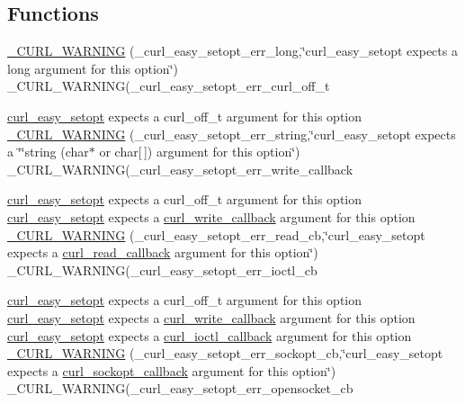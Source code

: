 \subsection*{Functions}
\begin{DoxyCompactItemize}
\item 
\hyperlink{typecheck-gcc_8h_a835f9ac5fa04c88a7cd643014f43c521}{\+\_\+\+C\+U\+R\+L\+\_\+\+W\+A\+R\+N\+I\+N\+G} (\+\_\+curl\+\_\+easy\+\_\+setopt\+\_\+err\+\_\+long,\char`\"{}curl\+\_\+easy\+\_\+setopt expects a long argument for this option\char`\"{}) \+\_\+\+C\+U\+R\+L\+\_\+\+W\+A\+R\+N\+I\+N\+G(\+\_\+curl\+\_\+easy\+\_\+setopt\+\_\+err\+\_\+curl\+\_\+off\+\_\+t
\item 
\hyperlink{easy_8h_a7b171739b7bb728b3b58b2e6ec454aa0}{curl\+\_\+easy\+\_\+setopt} expects a curl\+\_\+off\+\_\+t argument for this option \hyperlink{typecheck-gcc_8h_a219fe3ed7d487a8ffe131d7330ca2483}{\+\_\+\+C\+U\+R\+L\+\_\+\+W\+A\+R\+N\+I\+N\+G} (\+\_\+curl\+\_\+easy\+\_\+setopt\+\_\+err\+\_\+string,\char`\"{}curl\+\_\+easy\+\_\+setopt expects a \char`\"{}\char`\"{}string (char$\ast$ or char\mbox{[}$\,$\mbox{]}) argument for this option\char`\"{}) \+\_\+\+C\+U\+R\+L\+\_\+\+W\+A\+R\+N\+I\+N\+G(\+\_\+curl\+\_\+easy\+\_\+setopt\+\_\+err\+\_\+write\+\_\+callback
\item 
\hyperlink{easy_8h_a7b171739b7bb728b3b58b2e6ec454aa0}{curl\+\_\+easy\+\_\+setopt} expects a curl\+\_\+off\+\_\+t argument for this option \hyperlink{easy_8h_a7b171739b7bb728b3b58b2e6ec454aa0}{curl\+\_\+easy\+\_\+setopt} expects a \hyperlink{curl_8h_ad65e62dcde45b356254b0f25f38dd802}{curl\+\_\+write\+\_\+callback} argument for this option \hyperlink{typecheck-gcc_8h_ab760cc0249f77f50bcb61700f5da7dd5}{\+\_\+\+C\+U\+R\+L\+\_\+\+W\+A\+R\+N\+I\+N\+G} (\+\_\+curl\+\_\+easy\+\_\+setopt\+\_\+err\+\_\+read\+\_\+cb,\char`\"{}curl\+\_\+easy\+\_\+setopt expects a \hyperlink{curl_8h_a7516630ec17f247697dd3272be7ada74}{curl\+\_\+read\+\_\+callback} argument for this option\char`\"{}) \+\_\+\+C\+U\+R\+L\+\_\+\+W\+A\+R\+N\+I\+N\+G(\+\_\+curl\+\_\+easy\+\_\+setopt\+\_\+err\+\_\+ioctl\+\_\+cb
\item 
\hyperlink{easy_8h_a7b171739b7bb728b3b58b2e6ec454aa0}{curl\+\_\+easy\+\_\+setopt} expects a curl\+\_\+off\+\_\+t argument for this option \hyperlink{easy_8h_a7b171739b7bb728b3b58b2e6ec454aa0}{curl\+\_\+easy\+\_\+setopt} expects a \hyperlink{curl_8h_ad65e62dcde45b356254b0f25f38dd802}{curl\+\_\+write\+\_\+callback} argument for this option \hyperlink{easy_8h_a7b171739b7bb728b3b58b2e6ec454aa0}{curl\+\_\+easy\+\_\+setopt} expects a \hyperlink{curl_8h_ae0524f6ec082005e39eb275c71c59a3b}{curl\+\_\+ioctl\+\_\+callback} argument for this option \hyperlink{typecheck-gcc_8h_a1f08648ae4665286d7eafbb6bbd1a818}{\+\_\+\+C\+U\+R\+L\+\_\+\+W\+A\+R\+N\+I\+N\+G} (\+\_\+curl\+\_\+easy\+\_\+setopt\+\_\+err\+\_\+sockopt\+\_\+cb,\char`\"{}curl\+\_\+easy\+\_\+setopt expects a \hyperlink{curl_8h_a687bc180c1842bae4d28f8803c307c70}{curl\+\_\+sockopt\+\_\+callback} argument for this option\char`\"{}) \+\_\+\+C\+U\+R\+L\+\_\+\+W\+A\+R\+N\+I\+N\+G(\+\_\+curl\+\_\+easy\+\_\+setopt\+\_\+err\+\_\+opensocket\+\_\+cb

\end{DoxyCompactItemize}
